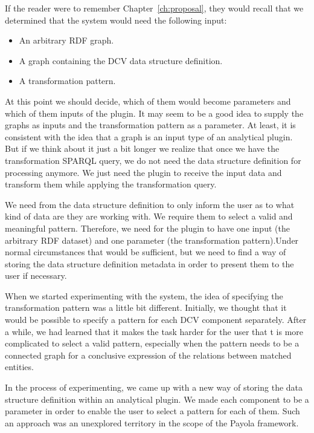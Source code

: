 If the reader were to remember Chapter~\ref{ch:proposal}, they would recall that we determined that 
the system would need the following input:
\begin{itemize}
  \item An arbitrary RDF graph.
  \item A graph containing the DCV data structure definition.
  \item A transformation pattern.
\end{itemize}

At this point we should decide, which of them would become parameters and which of 
them inputs of the plugin. It may seem to be a good idea to supply the 
graphs as inputs and the transformation pattern as a parameter. At least, it is 
consistent with the idea that a graph is an input type of an analytical plugin. 
But if we think about it just a bit longer we realize that once we have the 
transformation SPARQL query, we do not need the data structure definition for 
processing anymore. We just need the plugin to receive the input data and transform 
them while applying the transformation query.

We need from the data structure definition to only inform the user as to what kind of data are they 
are working 
with. We require them to select a valid and meaningful pattern. 
Therefore, we need for the plugin to have one input (the arbitrary RDF dataset) and 
one parameter (the transformation pattern).Under normal circumstances that would be sufficient, but we 
need to find a way of storing the data structure definition metadata in order 
to present them to the user if necessary.

When we started experimenting with the system, the idea of specifying the 
transformation pattern was a little bit different. Initially, we thought that it 
would be possible to specify a pattern for each DCV component separately. After 
a while, we had learned that it makes the task harder for the user that t is more complicated to select a 
valid pattern, especially when the pattern needs to be a connected graph for a conclusive expression
of the relations between matched entities.

In the process of experimenting, we came up with a new way of storing the 
data structure definition within an analytical plugin. We made each component to 
be a parameter in order to enable the user to select a pattern for each of 
them. Such an approach was an unexplored territory in the scope of the Payola framework.

